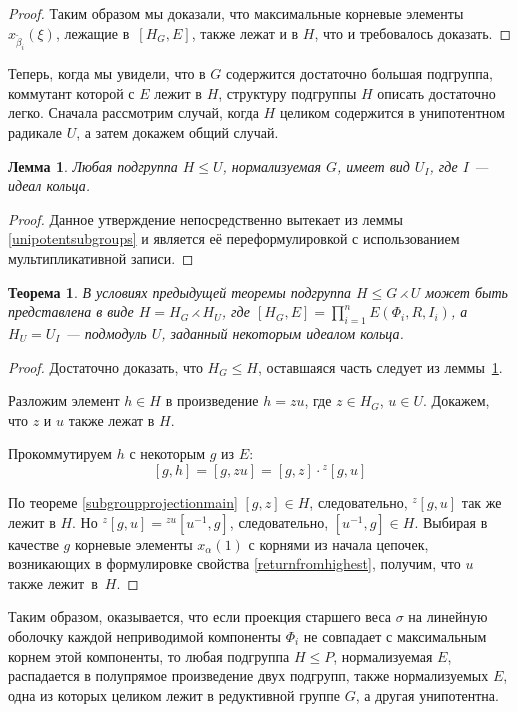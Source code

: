\documentclass[12pt]{matmex-diploma}
\theoremstyle{mystyleni}
\theoremstyle{mystyle}
\newtheorem{thm}{Теорема}
\newtheorem{lm}{Лемма}
\newcommand\refb[1]{\ref{#1}}
\renewcommand{\le}{\leqslant}
\begin{document}
\begin{proof}
Таким образом мы доказали, что максимальные корневые элементы $x_{\widetilde\beta_i}(\xi)$, лежащие в~$[H_G,E]$, также лежат и в $H$, что и требовалось доказать.

\end{proof}

Теперь, когда мы увидели, что в $G$ содержится достаточно большая подгруппа, коммутант которой с $E$ лежит в $H$, структуру подгруппы $H$ описать достаточно легко. Сначала рассмотрим случай, когда $H$ целиком содержится в унипотентном радикале $U$, а затем докажем общий случай.

\begin{lm}\label{unipotenttransitivity}
  Любая подгруппа $H \le U$, нормализуемая $G$, имеет вид $U_I$, где $I$ --- идеал кольца.
\end{lm}
\begin{proof}
Данное утверждение непосредственно вытекает из леммы \refb{unipotentsubgroups} и является её переформулировкой с использованием мультипликативной записи.
\end{proof}
\begin{thm}
В условиях предыдущей теоремы подгруппа $H\le G \rightthreetimes U$ может быть представлена в виде $H = H_G \rightthreetimes H_U$, где $[H_G,E] = \prod_{i=1}^n E(\Phi_i, R, I_i)$, а $H_U=U_I$ --- подмодуль $U$, заданный некоторым идеалом кольца.
\end{thm}
\begin{proof}
Достаточно доказать, что $H_G \le H$, оставшаяся часть следует из леммы~\refb{unipotenttransitivity}.

Разложим элемент $h \in H$ в произведение $h = z u$, где $z \in H_G$, $u \in U$. Докажем, что $z$ и $u$ также лежат в $H$.

Прокоммутируем $h$ с некоторым $g$ из $E$:
$$ [g, h] = [g,zu] = [g,z] \cdot {}^z[g,u] $$

По теореме \refb{subgroupprojectionmain} $[g,z]\in H$, следовательно, ${}^z[g,u]$ так же лежит в $H$. Но
$ {}^z[g,u] = {}^{zu}[u^{-1},g] $, следовательно, $[u^{-1},g] \in H$. Выбирая в качестве $g$ корневые элементы $x_\alpha(1)$ с корнями из начала цепочек, возникающих в формулировке свойства \refb{returnfromhighest}, получим, что $u$ также лежит~в~$H$.
\end{proof}

Таким образом, оказывается, что если проекция старшего веса $\sigma$ на линейную оболочку каждой неприводимой компоненты $\Phi_i$ не совпадает с максимальным корнем этой компоненты, то любая подгруппа $H \le P$, нормализуемая $E$, распадается в полупрямое произведение двух подгрупп, также нормализуемых $E$, одна из которых целиком лежит в редуктивной группе $G$, а другая унипотентна.
\end{document}
